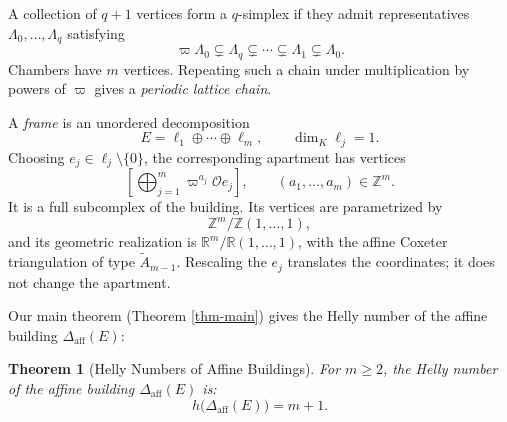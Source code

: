 \documentclass[12pt]{amsart}
\newtheorem{theorem}{Theorem}[section]
\theoremstyle{definition}
\theoremstyle{remark}
\begin{document}
A collection of $q+1$ vertices form a $q$-simplex if they admit representatives $\Lambda_0, \ldots, \Lambda_q$ satisfying
\[
  \varpi\Lambda_0\subsetneq\Lambda_q\subsetneq\cdots
  \subsetneq\Lambda_1\subsetneq\Lambda_0.
\]
Chambers have $m$ vertices. Repeating such a chain
under multiplication by powers of $\varpi$ gives a \emph{periodic lattice chain}.

A \emph{frame} is an unordered decomposition
\[
  E=\ell_1\oplus\cdots\oplus\ell_m,
  \qquad \dim_K\ell_j=1.
\]
Choosing $e_j\in\ell_j\setminus\{0\}$, the corresponding apartment has vertices
\[
  \left[
    \bigoplus_{j=1}^m\varpi^{a_j}\mathcal Oe_j
  \right],
  \qquad (a_1,\ldots,a_m)\in\mathbb Z^m.
\]
It is a full subcomplex of the building. Its vertices are
parametrized by
\[
  \mathbb Z^m/\mathbb Z(1,\ldots,1),
\]
and its geometric realization is
$\mathbb R^m/\mathbb R(1,\ldots,1)$, with the affine Coxeter triangulation of type $\widetilde A_{m-1}$.
Rescaling the $e_j$ translates the coordinates; it does not change the apartment. %




Our main theorem (Theorem \ref{thm-main}) gives the Helly number of the affine building $\Delta_{\mathrm{aff}}(E)$: 
\begin{theorem}[Helly Numbers of Affine Buildings]
\label{thm:affine-apartment-helly}
For $m \ge 2$, the Helly number of the affine building $\Delta_{\mathrm{aff}}(E)$ is:
\[
  h\bigl(\Delta_{\mathrm{aff}}(E)\bigr) = m + 1.
\]
\end{theorem}
\end{document}

